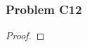 \documentclass[../../../main.tex]{subfiles}
\begin{document}
\subsubsection{Problem C12}
\begin{wts}

\end{wts}
\begin{proof}

\end{proof}
\end{document}
